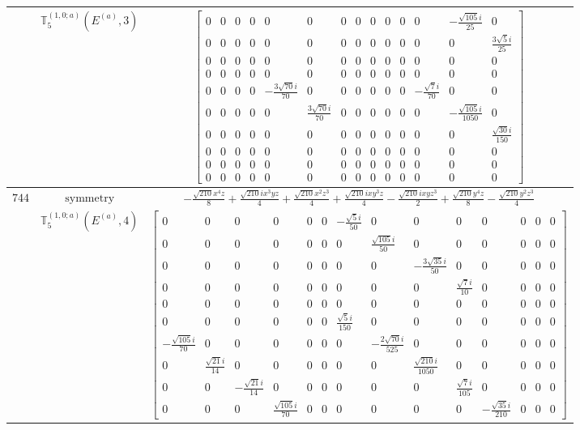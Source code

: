 \documentclass[fleqn,8pt,landscape]{jsarticle}
\begin{document}
\begin{longtable}{ccc}
$  $ & $ \mathbb{T}_{5}^{(1,0;a)}(E^{(a)},3) $ & $ \begin{bmatrix} 0 & 0 & 0 & 0 & 0 & 0 & 0 & 0 & 0 & 0 & 0 & 0 & - \frac{\sqrt{105} i}{25} & 0 \\ 0 & 0 & 0 & 0 & 0 & 0 & 0 & 0 & 0 & 0 & 0 & 0 & 0 & \frac{3 \sqrt{5} i}{25} \\ 0 & 0 & 0 & 0 & 0 & 0 & 0 & 0 & 0 & 0 & 0 & 0 & 0 & 0 \\ 0 & 0 & 0 & 0 & 0 & 0 & 0 & 0 & 0 & 0 & 0 & 0 & 0 & 0 \\ 0 & 0 & 0 & 0 & - \frac{3 \sqrt{70} i}{70} & 0 & 0 & 0 & 0 & 0 & 0 & - \frac{\sqrt{7} i}{70} & 0 & 0 \\ 0 & 0 & 0 & 0 & 0 & \frac{3 \sqrt{70} i}{70} & 0 & 0 & 0 & 0 & 0 & 0 & - \frac{\sqrt{105} i}{1050} & 0 \\ 0 & 0 & 0 & 0 & 0 & 0 & 0 & 0 & 0 & 0 & 0 & 0 & 0 & \frac{\sqrt{30} i}{150} \\ 0 & 0 & 0 & 0 & 0 & 0 & 0 & 0 & 0 & 0 & 0 & 0 & 0 & 0 \\ 0 & 0 & 0 & 0 & 0 & 0 & 0 & 0 & 0 & 0 & 0 & 0 & 0 & 0 \\ 0 & 0 & 0 & 0 & 0 & 0 & 0 & 0 & 0 & 0 & 0 & 0 & 0 & 0 \end{bmatrix} $ \\ \hline
$ 744 $ & $ \text{symmetry} $ & $ - \frac{\sqrt{210} x^{4} z}{8} + \frac{\sqrt{210} i x^{3} y z}{4} + \frac{\sqrt{210} x^{2} z^{3}}{4} + \frac{\sqrt{210} i x y^{3} z}{4} - \frac{\sqrt{210} i x y z^{3}}{2} + \frac{\sqrt{210} y^{4} z}{8} - \frac{\sqrt{210} y^{2} z^{3}}{4} $ \\
$  $ & $ \mathbb{T}_{5}^{(1,0;a)}(E^{(a)},4) $ & $ \begin{bmatrix} 0 & 0 & 0 & 0 & 0 & 0 & - \frac{\sqrt{5} i}{50} & 0 & 0 & 0 & 0 & 0 & 0 & 0 \\ 0 & 0 & 0 & 0 & 0 & 0 & 0 & \frac{\sqrt{105} i}{50} & 0 & 0 & 0 & 0 & 0 & 0 \\ 0 & 0 & 0 & 0 & 0 & 0 & 0 & 0 & - \frac{3 \sqrt{35} i}{50} & 0 & 0 & 0 & 0 & 0 \\ 0 & 0 & 0 & 0 & 0 & 0 & 0 & 0 & 0 & \frac{\sqrt{7} i}{10} & 0 & 0 & 0 & 0 \\ 0 & 0 & 0 & 0 & 0 & 0 & 0 & 0 & 0 & 0 & 0 & 0 & 0 & 0 \\ 0 & 0 & 0 & 0 & 0 & 0 & \frac{\sqrt{5} i}{150} & 0 & 0 & 0 & 0 & 0 & 0 & 0 \\ - \frac{\sqrt{105} i}{70} & 0 & 0 & 0 & 0 & 0 & 0 & - \frac{2 \sqrt{70} i}{525} & 0 & 0 & 0 & 0 & 0 & 0 \\ 0 & \frac{\sqrt{21} i}{14} & 0 & 0 & 0 & 0 & 0 & 0 & \frac{\sqrt{210} i}{1050} & 0 & 0 & 0 & 0 & 0 \\ 0 & 0 & - \frac{\sqrt{21} i}{14} & 0 & 0 & 0 & 0 & 0 & 0 & \frac{\sqrt{7} i}{105} & 0 & 0 & 0 & 0 \\ 0 & 0 & 0 & \frac{\sqrt{105} i}{70} & 0 & 0 & 0 & 0 & 0 & 0 & - \frac{\sqrt{35} i}{210} & 0 & 0 & 0 \end{bmatrix} $ \\ \hline

\end{longtable}
\end{document}
